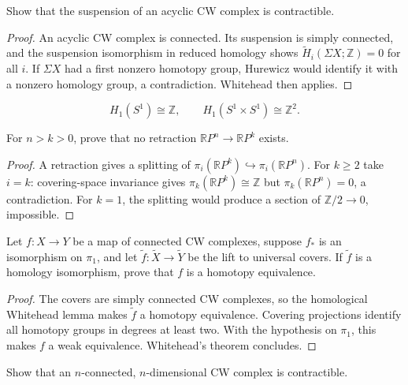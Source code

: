 \begin{exercise}
Show that the suspension of an acyclic CW
complex is contractible.
\end{exercise}

\begin{proof}
An acyclic CW complex is connected.  Its
suspension is simply connected, and the
suspension isomorphism in reduced homology
shows $\widetilde H_i(\Sigma X;\mathbb{Z})=0$
for all $i$.  If $\Sigma X$ had a first
nonzero homotopy group, Hurewicz would
identify it with a nonzero homology group,
a contradiction.  Whitehead then applies.
\end{proof}

\begin{corollary}
$$
H_1(S^1)\cong\mathbb{Z},
\qquad
H_1(S^1\times S^1)\cong\mathbb{Z}^2.
$$
\end{corollary}

\begin{exercise}
For $n>k>0$, prove that no retraction
$\mathbb{R}P^n\to\mathbb{R}P^k$ exists.
\end{exercise}

\begin{proof}
A retraction gives a splitting of
$\pi_i(\mathbb{R}P^k)
\hookrightarrow\pi_i(\mathbb{R}P^n)$.
For $k\geq2$ take $i=k$: covering-space
invariance gives
$\pi_k(\mathbb{R}P^k)\cong\mathbb{Z}$
but $\pi_k(\mathbb{R}P^n)=0$, a
contradiction.  For $k=1$, the splitting
would produce a section of
$\mathbb{Z}/2\to0$, impossible.
\end{proof}

\begin{exercise}
Let $f:X\to Y$ be a map of connected CW
complexes, suppose $f_*$ is an isomorphism
on $\pi_1$, and let
$\widetilde f:\widetilde X\to\widetilde Y$
be the lift to universal covers.  If
$\widetilde f$ is a homology isomorphism,
prove that $f$ is a homotopy equivalence.
\end{exercise}

\begin{proof}
The covers are simply connected CW
complexes, so the homological Whitehead
lemma makes $\widetilde f$ a homotopy
equivalence.  Covering projections identify
all homotopy groups in degrees at least two.
With the hypothesis on $\pi_1$, this makes
$f$ a weak equivalence.  Whitehead's theorem
concludes.
\end{proof}
\begin{exercise}
Show that an $n$-connected,
$n$-dimensional CW complex is contractible.
\end{exercise}

